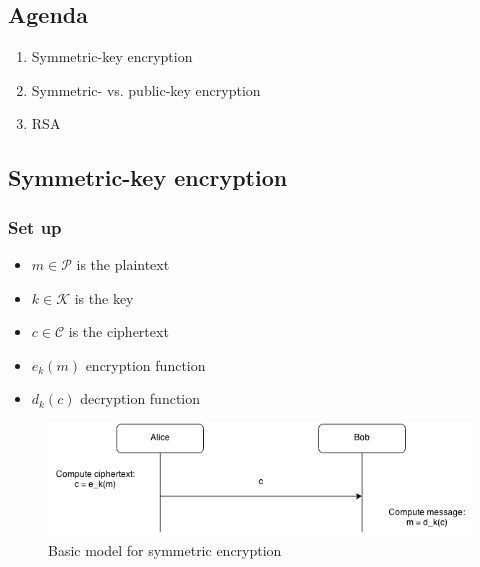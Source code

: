 

\subsection{Agenda}
\begin{enumerate}
\item Symmetric-key encryption
\item Symmetric- vs. public-key encryption
\item RSA
\end{enumerate}

\subsection{Symmetric-key encryption}
\subsubsection{Set up}
\begin{itemize}
  \item $m \in \mathcal{P}$ is the plaintext
  \item $k \in \mathcal{K}$ is the key
  \item $c \in \mathcal{C}$ is the ciphertext
  \item $e_k(m)$ encryption function
  \item $d_k(c)$ decryption function
\end{itemize}

\begin{figure}[H]
  \begin{centering}
    \includegraphics[width=15cm]{images/1-sym-enc}
    \caption{Basic model for symmetric encryption}
  \end{centering}
  \label{fig:sym-enc}
\end{figure}

